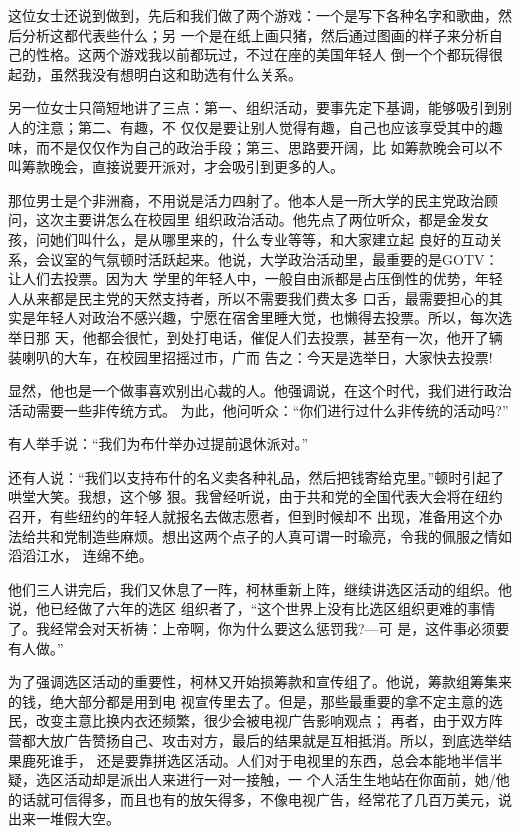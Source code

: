 ﻿\documentclass[11pt]{article}
\begin{document}
这位女士还说到做到，先后和我们做了两个游戏：一个是写下各种名字和歌曲，然后分析这都代表些什么；另
一个是在纸上画只猪，然后通过图画的样子来分析自己的性格。这两个游戏我以前都玩过，不过在座的美国年轻人
倒一个个都玩得很起劲，虽然我没有想明白这和助选有什么关系。

另一位女士只简短地讲了三点：第一、组织活动，要事先定下基调，能够吸引到别人的注意；第二、有趣，不
仅仅是要让别人觉得有趣，自己也应该享受其中的趣味，而不是仅仅作为自己的政治手段；第三、思路要开阔，比
如筹款晚会可以不叫筹款晚会，直接说要开派对，才会吸引到更多的人。

那位男士是个非洲裔，不用说是活力四射了。他本人是一所大学的民主党政治顾问，这次主要讲怎么在校园里
组织政治活动。他先点了两位听众，都是金发女孩，问她们叫什么，是从哪里来的，什么专业等等，和大家建立起
良好的互动关系，会议室的气氛顿时活跃起来。他说，大学政治活动里，最重要的是GOTV：让人们去投票。因为大
学里的年轻人中，一般自由派都是占压倒性的优势，年轻人从来都是民主党的天然支持者，所以不需要我们费太多
口舌，最需要担心的其实是年轻人对政治不感兴趣，宁愿在宿舍里睡大觉，也懒得去投票。所以，每次选举日那
天，他都会很忙，到处打电话，催促人们去投票，甚至有一次，他开了辆装喇叭的大车，在校园里招摇过市，广而
告之：今天是选举日，大家快去投票!

显然，他也是一个做事喜欢别出心裁的人。他强调说，在这个时代，我们进行政治活动需要一些非传统方式。
为此，他问听众：``你们进行过什么非传统的活动吗?''

有人举手说：``我们为布什举办过提前退休派对。''

还有人说：``我们以支持布什的名义卖各种礼品，然后把钱寄给克里。''顿时引起了哄堂大笑。我想，这个够
狠。我曾经听说，由于共和党的全国代表大会将在纽约召开，有些纽约的年轻人就报名去做志愿者，但到时候却不
出现，准备用这个办法给共和党制造些麻烦。想出这两个点子的人真可谓一时瑜亮，令我的佩服之情如滔滔江水，
连绵不绝。

他们三人讲完后，我们又休息了一阵，柯林重新上阵，继续讲选区活动的组织。他说，他已经做了六年的选区
组织者了，``这个世界上没有比选区组织更难的事情了。我经常会对天祈祷：上帝啊，你为什么要这么惩罚我?---可
是，这件事必须要有人做。''

为了强调选区活动的重要性，柯林又开始损筹款和宣传组了。他说，筹款组筹集来的钱，绝大部分都是用到电
视宣传里去了。但是，那些最重要的拿不定主意的选民，改变主意比换内衣还频繁，很少会被电视广告影响观点；
再者，由于双方阵营都大放广告赞扬自己、攻击对方，最后的结果就是互相抵消。所以，到底选举结果鹿死谁手，
还是要靠拼选区活动。人们对于电视里的东西，总会本能地半信半疑，选区活动却是派出人来进行一对一接触，一
个人活生生地站在你面前，她/他的话就可信得多，而且也有的放矢得多，不像电视广告，经常花了几百万美元，说
出来一堆假大空。
\end{document}
